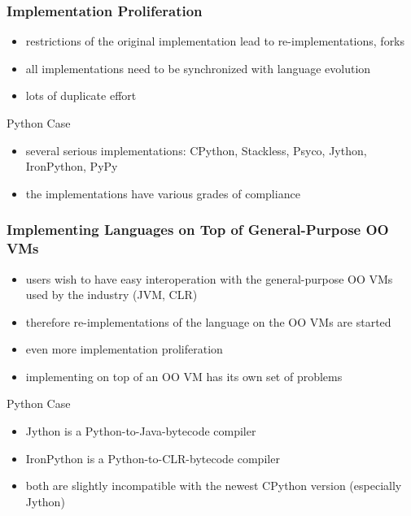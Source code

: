 \documentclass[utf8x]{beamer}
\begin{document}
\begin{frame}
  \frametitle{Implementation Proliferation}
  \begin{itemize}
  \item
    restrictions of the original implementation lead to re-implementations,
    forks
  \item
    all implementations need to be synchronized with language evolution
  \item
    lots of duplicate effort
  \end{itemize}
  \pause
  \begin{block}{
    Python Case}
    \begin{itemize}
    \item
      several serious implementations: CPython, Stackless, Psyco, Jython,
      IronPython, PyPy
    \item
      the implementations have various grades of compliance
    \end{itemize}
  \end{block}
\end{frame}

\begin{frame}
  \frametitle{Implementing Languages on Top of General-Purpose OO VMs}
  \begin{itemize}
  \item
    users wish to have easy interoperation with the general-purpose OO VMs used
    by the industry (JVM, CLR)
  \item
    therefore re-implementations of the language on the OO VMs are started
  \item
    even more implementation proliferation
  \item
    implementing on top of an OO VM has its own set of problems
  \end{itemize}
  \pause
  \begin{block}{
    Python Case}
    \begin{itemize}
    \item
      \alert{Jython} is a Python-to-Java-bytecode compiler
    \item
      \alert{IronPython} is a Python-to-CLR-bytecode compiler
    \item
      both are slightly incompatible with the newest CPython version (especially
      Jython)
    \end{itemize}
  \end{block}
\end{frame}
\end{document}
